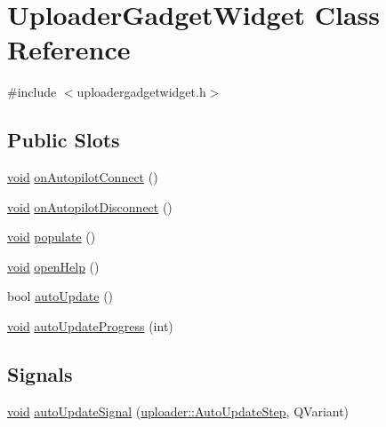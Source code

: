 \hypertarget{class_uploader_gadget_widget}{\section{\-Uploader\-Gadget\-Widget \-Class \-Reference}
\label{class_uploader_gadget_widget}
}


{\ttfamily \#include $<$uploadergadgetwidget.\-h$>$}

\subsection*{\-Public \-Slots}
\begin{DoxyCompactItemize}
\item 
\hyperlink{group___u_a_v_objects_plugin_ga444cf2ff3f0ecbe028adce838d373f5c}{void} \hyperlink{group___y_modem_uploader_gaea63c2ee4a2337a9c75b7e6908a07f68}{on\-Autopilot\-Connect} ()
\item 
\hyperlink{group___u_a_v_objects_plugin_ga444cf2ff3f0ecbe028adce838d373f5c}{void} \hyperlink{group___y_modem_uploader_ga1b05eaf13f62105422817f202a60d4c5}{on\-Autopilot\-Disconnect} ()
\item 
\hyperlink{group___u_a_v_objects_plugin_ga444cf2ff3f0ecbe028adce838d373f5c}{void} \hyperlink{group___y_modem_uploader_ga5c67435d0108ea6ee60ef37fd1ad3298}{populate} ()
\item 
\hyperlink{group___u_a_v_objects_plugin_ga444cf2ff3f0ecbe028adce838d373f5c}{void} \hyperlink{group___y_modem_uploader_ga49b9f0a5fc35f08fc0ee463dedcfe341}{open\-Help} ()
\item 
bool \hyperlink{group___y_modem_uploader_gae4f6b196112377e3983e45e785c14242}{auto\-Update} ()
\item 
\hyperlink{group___u_a_v_objects_plugin_ga444cf2ff3f0ecbe028adce838d373f5c}{void} \hyperlink{group___y_modem_uploader_gaa59bd4196108e1a79e22ee1d10cf4a92}{auto\-Update\-Progress} (int)
\end{DoxyCompactItemize}
\subsection*{\-Signals}
\begin{DoxyCompactItemize}
\item 
\hyperlink{group___u_a_v_objects_plugin_ga444cf2ff3f0ecbe028adce838d373f5c}{void} \hyperlink{group___y_modem_uploader_ga87ead7222452d2bbbbde0f0450ed8c11}{auto\-Update\-Signal} (\hyperlink{namespaceuploader_adb90c08cc33a348c2363c1d7a9626422}{uploader\-::\-Auto\-Update\-Step}, \-Q\-Variant)
\end{DoxyCompactItemize}
